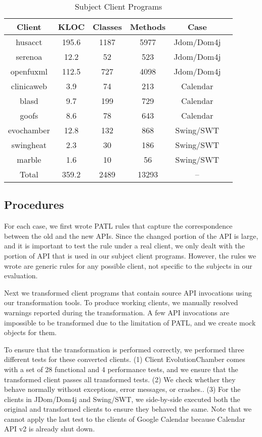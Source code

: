 \documentclass[letterpaper, USenglish]{lipics-v2016}
\newcommand{\PATL}{PATL\xspace}
\theoremstyle{plain}
\begin{document}
\begin{table}
  \centering
  \caption{Subject Client Programs}
  \label{tbl:benchmark}
  \footnotesize
  \begin{tabular}{|c|c|c|c|c|c|}
    \hline
    Client & KLOC & Classes & Methods  & Case\\
    \hline \hline
    husacct & 195.6 & 1187  & 5977 & Jdom/Dom4j \\
    \hline
    serenoa & 12.2  & 52 & 523 & Jdom/Dom4j \\
    \hline
    openfuxml & 112.5 & 727 & 4098 & Jdom/Dom4j \\
    \hline
    clinicaweb & 3.9 & 74  & 213 & Calendar \\
    \hline
    blasd & 9.7 & 199 & 729 & Calendar  \\
    \hline
    goofs & 8.6 & 78 & 643 & Calendar  \\
    \hline
    evochamber & 12.8 & 132 & 868 & Swing/SWT \\
    \hline
    swingheat & 2.3 & 30 & 186 & Swing/SWT \\
    \hline
    marble & 1.6 & 10 & 56 & Swing/SWT \\
    \hline
    \hline
    Total & 359.2 & 2489 & 13293 & --\\
    \hline
  \end{tabular}
  \vspace{-10pt}
\end{table}

\subsection{Procedures}
For each case, we first wrote \PATL rules that capture the
correspondence between the old and the new APIs. Since the changed
portion of the API is large, and it is important to test the rule
under a real client, we only dealt with the portion of API that is
used in our subject client programs. However, the rules we wrote
are generic rules for any possible client, not specific to the
subjects in our evaluation.  


Next we transformed client programs that contain source API
invocations using our transformation tools. To produce working
clients, we manually resolved warnings reported during the
transformation. A few API invocations
are impossible to be transformed due to the limitation of \PATL, and we create mock objects for them.

To ensure that the transformation is performed correctly, we
performed three different
tests for these converted clients. (1) Client EvolutionChamber comes with a set
of 28 functional and 4 performance tests, and we ensure that the transformed client
passes all transformed tests. (2) We check whether they behave normally without exceptions, error messages, or crashes.. (3) For the clients in
JDom/Dom4j and Swing/SWT, we side-by-side executed both the original and transformed clients to ensure they behaved the same. Note that we cannot apply the last test to the clients
of Google Calendar because Calendar API v2 is already shut down.
\end{document}
